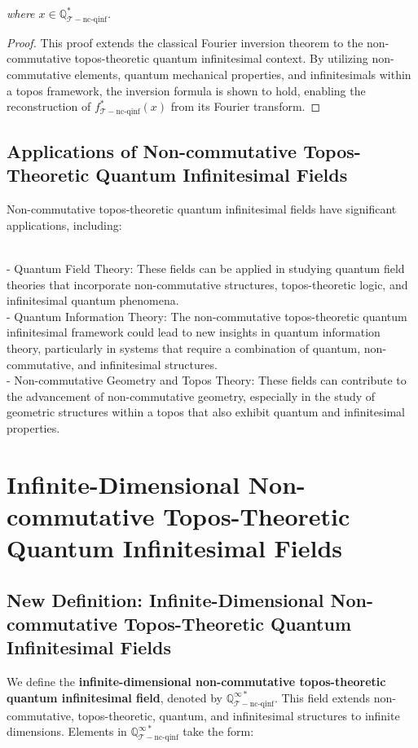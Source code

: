 \documentclass{article}
\begin{document}
\textit{where \(x \in \mathbb{Q}_{\mathcal{T}-\text{nc-qinf}}^*\).}

\begin{proof}
This proof extends the classical Fourier inversion theorem to the non-commutative topos-theoretic quantum infinitesimal context. By utilizing non-commutative elements, quantum mechanical properties, and infinitesimals within a topos framework, the inversion formula is shown to hold, enabling the reconstruction of \(f_{\mathcal{T}-\text{nc-qinf}}^*(x)\) from its Fourier transform.
\end{proof}

\subsection{Applications of Non-commutative Topos-Theoretic Quantum Infinitesimal Fields}
Non-commutative topos-theoretic quantum infinitesimal fields have significant applications, including:

{\ }\\
- Quantum Field Theory: These fields can be applied in studying quantum field theories that incorporate non-commutative structures, topos-theoretic logic, and infinitesimal quantum phenomena.
{\ }\\
- Quantum Information Theory: The non-commutative topos-theoretic quantum infinitesimal framework could lead to new insights in quantum information theory, particularly in systems that require a combination of quantum, non-commutative, and infinitesimal structures.
{\ }\\
- Non-commutative Geometry and Topos Theory: These fields can contribute to the advancement of non-commutative geometry, especially in the study of geometric structures within a topos that also exhibit quantum and infinitesimal properties.

\section{Infinite-Dimensional Non-commutative Topos-Theoretic Quantum Infinitesimal Fields}
\subsection{New Definition: Infinite-Dimensional Non-commutative Topos-Theoretic Quantum Infinitesimal Fields}
We define the \textbf{infinite-dimensional non-commutative topos-theoretic quantum infinitesimal field}, denoted by \(\mathbb{Q}_{\mathcal{T}-\text{nc-qinf}}^{\infty *}\). This field extends non-commutative, topos-theoretic, quantum, and infinitesimal structures to infinite dimensions. Elements in \(\mathbb{Q}_{\mathcal{T}-\text{nc-qinf}}^{\infty *}\) take the form:
\end{document}
